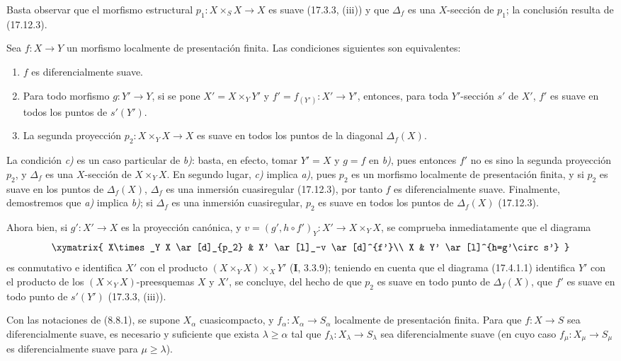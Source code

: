 Basta observar que el morfismo estructural $p_1:X\times_SX\to X$ es suave (17.3.3, (iii)) y que $\Delta_f$ es una $X$-sección de $p_1$; la conclusión resulta de (17.12.3).

\begin{proposition}[17.12.5]
\label{IV.17.12.5}
Sea $f:X\to Y$ un morfismo localmente de presentación finita. Las condiciones siguientes son equivalentes:
\begin{enumerate}
  \item[\textup{a)}] $f$ es diferencialmente suave.
  \item[\textup{b)}] Para todo morfismo $g:Y'\to Y$, si se pone $X'=X\times_Y Y'$ y $f'=f_{(Y')}:X'\to Y'$, entonces, para toda $Y'$-sección $s'$ de $X'$, $f'$ es suave en todos los puntos de $s'(Y')$.
  \item[\textup{c)}] La segunda proyección $p_2:X\times_YX\to X$ es suave en todos los puntos de la diagonal $\Delta_f(X)$.
\end{enumerate}
\end{proposition}


La condición \emph{c)} es un caso particular de \emph{b)}: basta, en efecto, tomar $Y'=X$ y $g=f$ en \emph{b)}, pues entonces $f'$ no es sino la segunda proyección $p_2$, y $\Delta_f$ es una $X$-sección de $X\times_YX$. En segundo lugar, \emph{c)} implica \emph{a)}, pues $p_2$ es un morfismo localmente de presentación finita, y si $p_2$ es suave en los puntos de $\Delta_f(X)$, $\Delta_f$ es una inmersión cuasiregular (17.12.3), por tanto $f$ es diferencialmente suave. Finalmente, demostremos que \emph{a)} implica \emph{b)}; si $\Delta_f$ es una inmersión cuasiregular, $p_2$ es suave en todos los puntos de $\Delta_f(X)$ (17.12.3).

Ahora bien, si $g':X'\to X$ es la proyección canónica, y $v=(g',h\circ f')_Y:X'\to X\times_YX$, se comprueba inmediatamente que el diagrama
\[
\xymatrix{
  X\times_Y X \ar[d]_{p_2} & X' \ar[l]_-v \ar[d]^{f'}\\
  X & Y' \ar[l]^{h=g'\circ s'}
}
\]
es conmutativo e identifica $X'$ con el producto $(X\times_YX)\times_XY'$ (\textbf I, 3.3.9); teniendo en cuenta que el diagrama (17.4.1.1) identifica $Y'$ con el producto de los $(X\times_YX)$-preesquemas $X$ y $X'$, se concluye, del hecho de que $p_2$ es suave en todo punto de $\Delta_f(X)$, que $f'$ es suave en todo punto de $s'(Y')$ (17.3.3, (iii)).

\begin{corollary}[17.12.6]
\label{IV.17.12.6}
Con las notaciones de \textup{(8.8.1)}, se supone $X_\alpha$ cuasicompacto, y $f_\alpha:X_\alpha\to S_\alpha$ localmente de presentación finita. Para que $f:X\to S$ sea diferencialmente suave, es necesario y suficiente que exista $\lambda\geq\alpha$ tal que $f_\lambda:X_\lambda\to S_\lambda$ sea diferencialmente suave \textup{(}en cuyo caso $f_\mu:X_\mu\to S_\mu$ es diferencialmente suave para $\mu\geq\lambda$\textup{)}.
\end{corollary}

